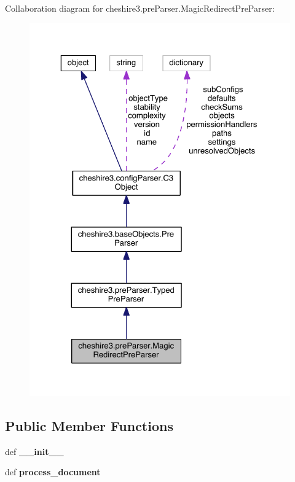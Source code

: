 Collaboration diagram for cheshire3.\-pre\-Parser.\-Magic\-Redirect\-Pre\-Parser\-:
\nopagebreak
\begin{figure}[H]
\begin{center}
\leavevmode
\includegraphics[width=325pt]{classcheshire3_1_1pre_parser_1_1_magic_redirect_pre_parser__coll__graph}
\end{center}
\end{figure}
\subsection*{Public Member Functions}
\begin{DoxyCompactItemize}
\item 
\hypertarget{classcheshire3_1_1pre_parser_1_1_magic_redirect_pre_parser_a2a580ec29d0dc5f11decd5e425af6567}{def {\bfseries \-\_\-\-\_\-init\-\_\-\-\_\-}}\label{classcheshire3_1_1pre_parser_1_1_magic_redirect_pre_parser_a2a580ec29d0dc5f11decd5e425af6567}

\item 
\hypertarget{classcheshire3_1_1pre_parser_1_1_magic_redirect_pre_parser_ae7e26e609c50313fca44fc664587984f}{def {\bfseries process\-\_\-document}}\label{classcheshire3_1_1pre_parser_1_1_magic_redirect_pre_parser_ae7e26e609c50313fca44fc664587984f}

\end{DoxyCompactItemize}
